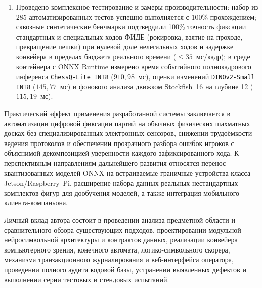 \begin{enumerate}
    \item Проведено комплексное тестирование и замеры производительности: набор из 285 автоматизированных тестов успешно выполняется с 100\% прохождением; сквозные синтетические бенчмарки подтвердили 100\% точность фиксации стандартных и специальных ходов ФИДЕ (рокировка, взятие на проходе, превращение пешки) при нулевой доле нелегальных ходов и задержке конвейера в пределах бюджета реального времени ($\le 35$~мс/кадр); в среде контейнера с ONNX Runtime измерено время событийного полнокадрового инференса \texttt{ChessQ-Lite INT8} ($910{,}98$~мс), оценки изменений \texttt{DINOv2-Small INT8} ($145{,}77$~мс) и фонового анализа движком Stockfish~16 на глубине 12 ($115{,}19$~мс).
\end{enumerate}

Практический эффект применения разработанной системы заключается в автоматизации цифровой фиксации партий на обычных физических шахматных досках без специализированных электронных сенсоров, снижении трудоёмкости ведения протоколов и обеспечении прозрачного разбора ошибок игроков с объяснимой декомпозицией уверенности каждого зафиксированного хода. К перспективным направлениям дальнейшего развития относятся перенос квантизованных моделей ONNX на встраиваемые граничные устройства класса Jetson/Raspberry~Pi, расширение набора данных реальных нестандартных комплектов фигур для дообучения моделей, а также интеграция мобильного клиента-компаньона.

Личный вклад автора состоит в проведении анализа предметной области и сравнительного обзора существующих подходов, проектировании модульной нейросимвольной архитектуры и контрактов данных, реализации конвейера компьютерного зрения, конечного автомата, логико-символьного скорера, механизма транзакционного журналирования и веб-интерфейса оператора, проведении полного аудита кодовой базы, устранении выявленных дефектов и выполнении серии тестовых и стендовых испытаний.
